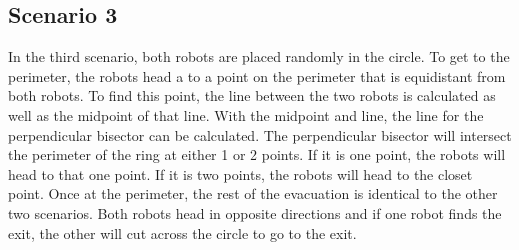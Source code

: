 \documentclass[12pt,letterpaper]{article}
\begin{document}
    \subsection{Scenario 3}
        In the third scenario, both robots are placed randomly in the circle. To get to the perimeter, the robots head a to a point on the perimeter that is equidistant from both robots. To find this point, the line between the two robots is calculated as well as the midpoint of that line. With the midpoint and line, the line for the perpendicular bisector can be calculated. The perpendicular bisector will intersect the perimeter of the ring at either 1 or 2 points. If it is one point, the robots will head to that one point. If it is two points, the robots will head to the closet point. Once at the perimeter, the rest of the evacuation is identical to the other two scenarios. Both robots head in opposite directions and if one robot finds the exit, the other will cut across the circle to go to the exit.
        
%         
%         
%         
        \begin{center}
        \end{center}
        
        
\end{document}

